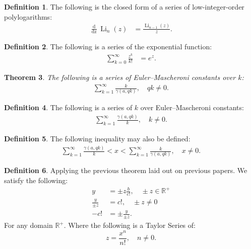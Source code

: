 \documentclass[10pt]{article}
\theoremstyle{plain}
\newtheorem{theorem}{Theorem}[section]
\theoremstyle{definition}
\newtheorem{definition}[theorem]{Definition}
\theoremstyle{remark}
\begin{document}
\begin{definition}
	The following is the closed form of a series of low-integer-order polylogarithms:
	\begin{align*}
		\frac{\operatorname{d}}{\operatorname{dz}} \operatorname{Li}_{n}(z) &= \frac{\operatorname{Li}_{n-1}(z)}{z}.
	\end{align*}
\end{definition}

\begin{definition}
	The following is a series of the exponential function:
	\begin{align*}
		\sum_{k=0}^{\infty} \frac{z^k}{k!} &= e^{z}.
	\end{align*}
\end{definition}

\begin{theorem}
	The following is a series of Euler–Mascheroni constants over $k$:
	\begin{align*}
		\sum_{k=1}^{\infty} \frac{k}{\gamma(a, qk)}, \quad qk \neq 0.
	\end{align*}
\end{theorem}

\begin{definition}
	The following is a series of $k$ over Euler–Mascheroni constants:
	\begin{align*}
		\sum_{k=1}^{\infty} \frac{\gamma(a, qk)}{k}, \quad k \neq 0.
	\end{align*}
\end{definition}

\begin{definition}
	The following inequality may also be defined:
	\begin{align*}
		\sum_{k=1}^{\infty} \frac{\gamma(a, qk)}{k} < x < \sum_{k=1}^{\infty} \frac{k}{\gamma(a, qk)}, \quad x \neq 0.
	\end{align*}
\end{definition}

\begin{definition}
	Applying the previous theorem laid out on previous papers. We satisfy the following:
	\begin{align*}
		y &= \pm z \frac{b}{c!}, \quad \pm z \in \mathbb{R}^{+}\\
		\frac{y}{\pm z} &= c!, \quad \pm z \neq 0\\
		-c! &= \pm \frac{y}{\pm z}.
	\end{align*}
	For any domain $\mathbb{R}^{+}$. Where the following is a Taylor Series of:
	\begin{equation}
		z = \frac{x^n}{n!}, \quad n \neq 0.
	\end{equation}
\end{definition}
\end{document}
